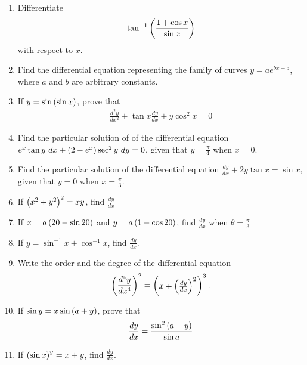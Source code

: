  \begin{enumerate}
 \item Differentiate 
	\begin{align*}
	 \tan^{-1}\left(\frac{1+\cos x}{\sin x}\right) 
	\end{align*} 
		with respect to $x$.
  

\item Find the differential equation representing the family of curves $y=ae^{bx+5}$, where $a$ and $b$ are arbitrary constants.

\item If $y=\sin\left(\sin x\right)$, prove that 
		\begin{align*}
			\frac{d^{2}y}{dx^{2}}+\tan x \frac{dy}{dx}+y\cos^{2}x=0
		\end{align*}
	\item Find the particular solution of of the differential equation $e^{x}\tan y~ dx +\left(2-e^{x}\right)\sec^{2} y ~dy=0$, given that $y=\frac{\pi}{4}$ when $x=0$. 
	\item Find the particular solution of the differential equation  $\frac{dy}{dx}+2y\tan x =\sin x$, given that $y=0$ when $x=\frac{\pi}{3}$.
 
 \item If ${\left(x^{2}+y^{2}\right)}^{2}=xy$, find $\frac{dy}{dx}$

\item If $x=a\left(20-\sin 20\right)$ and $y=a\left(1-\cos 20\right)$, find $\frac{dy}{dx}$ when $\theta=\frac{\pi}{3}$

\item If $y =\sin^{-1} x + \cos^{-1} x$, find $\frac{dy}{dx}$.
\item Write the order and the degree of the differential equation
\begin{align*}
\left(\frac{d^4y}{dx^4}\right)^2=\begin{pmatrix}x+\left(\frac{dy}{dx}\right)^2\end{pmatrix}^3.
\end{align*}
 \item If $\sin{y} =  x  \sin{\ensuremath{\left(a+y\right)}}$, prove that
\begin{align*}
    \frac{dy}{dx} = \frac{\sin^{2}{\left(a+y\right)}}{\sin{a}}
\end{align*}
\item If $\left(\sin {x}\right)^{y}= x+y$, find $\frac{dy}{dx}$.


\end{enumerate}
